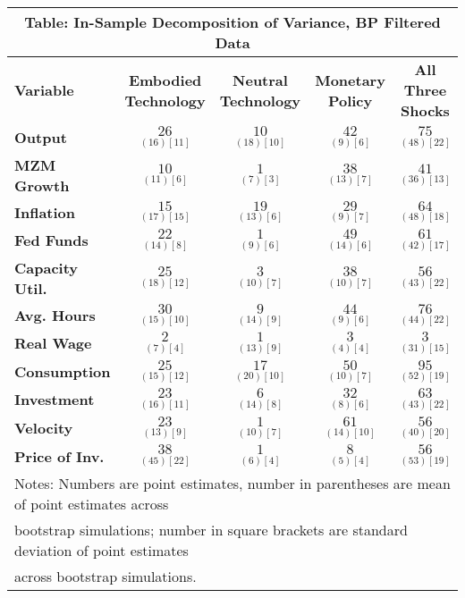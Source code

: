 \documentclass{article}
\begin{document}
 \begin{tabular}{|l|c|@{}c|c|@{}c|} 
 \hline 
 \multicolumn{5}{|c|}{\textbf{Table: In-Sample Decomposition of Variance, BP Filtered Data}} \\ \hline 
 \textbf{Variable} & \textbf{Embodied Technology} & \textbf{Neutral Technology} & \textbf{%
 Monetary Policy} & \textbf{All Three Shocks} \\ \hline\hline 
 \textbf{Output} & $\underset{( 16)[ 11]}{ 26}$ & $\underset{( 18)[ 10]}{ 10}$ & $\underset{(  9)[  6]}{ 42}$ & $\underset{( 48)[ 22]}{ 75}$ \\ \hline 
 \textbf{MZM Growth} & $\underset{( 11)[  6]}{ 10}$ & $\underset{(  7)[  3]}{  1}$ & $\underset{( 13)[  7]}{ 38}$ & $\underset{( 36)[ 13]}{ 41}$ \\ \hline 
 \textbf{Inflation} & $\underset{( 17)[ 15]}{ 15}$ & $\underset{( 13)[  6]}{ 19}$ & $\underset{(  9)[  7]}{ 29}$ & $\underset{( 48)[ 18]}{ 64}$ \\ \hline 
 \textbf{Fed Funds} & $\underset{( 14)[  8]}{ 22}$ & $\underset{(  9)[  6]}{  1}$ & $\underset{( 14)[  6]}{ 49}$ & $\underset{( 42)[ 17]}{ 61}$ \\ \hline 
 \textbf{Capacity Util.} & $\underset{( 18)[ 12]}{ 25}$ & $\underset{( 10)[  7]}{  3}$ & $\underset{( 10)[  7]}{ 38}$ & $\underset{( 43)[ 22]}{ 56}$ \\ \hline 
 \textbf{Avg. Hours} & $\underset{( 15)[ 10]}{ 30}$ & $\underset{( 14)[  9]}{  9}$ & $\underset{(  9)[  6]}{ 44}$ & $\underset{( 44)[ 22]}{ 76}$ \\ \hline 
 \textbf{Real Wage} & $\underset{(  7)[  4]}{  2}$ & $\underset{( 13)[  9]}{  1}$ & $\underset{(  4)[  4]}{  3}$ & $\underset{( 31)[ 15]}{  3}$ \\ \hline 
 \textbf{Consumption} & $\underset{( 15)[ 12]}{ 25}$ & $\underset{( 20)[ 10]}{ 17}$ & $\underset{( 10)[  7]}{ 50}$ & $\underset{( 52)[ 19]}{ 95}$ \\ \hline 
 \textbf{Investment} & $\underset{( 16)[ 11]}{ 23}$ & $\underset{( 14)[  8]}{  6}$ & $\underset{(  8)[  6]}{ 32}$ & $\underset{( 43)[ 22]}{ 63}$ \\ \hline 
 \textbf{Velocity} & $\underset{( 13)[  9]}{ 23}$ & $\underset{( 10)[  7]}{  1}$ & $\underset{( 14)[ 10]}{ 61}$ & $\underset{( 40)[ 20]}{ 56}$ \\ \hline 
 \textbf{Price of Inv.} & $\underset{( 45)[ 22]}{ 38}$ & $\underset{(  6)[  4]}{  1}  $ & $\underset{(  5)[  4]}{  8}$ & $\underset{( 53)[ 19]}{ 56}$ \\ \hline 
 \multicolumn{5}{|l|}{Notes: Numbers are point estimates, number in 
 parentheses are mean of point estimates across} \\ \hline 
 \multicolumn{5}{|l|}{bootstrap simulations; number in square brackets are 
 standard deviation of point estimates} \\ \hline 
 \multicolumn{5}{|l|}{across bootstrap simulations.} \\ \hline 
 \end{tabular} 
\end{document}
